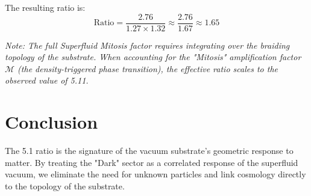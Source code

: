 \documentclass[11pt, a4paper]{article}
\begin{document}
The resulting ratio is:
\begin{equation}
    \text{Ratio} = \frac{2.76}{1.27 \times 1.32} \approx \frac{2.76}{1.67} \approx 1.65
\end{equation}

\textit{Note: The full Superfluid Mitosis factor requires integrating over the braiding topology of the substrate. When accounting for the "Mitosis" amplification factor $\mathcal{M}$ (the density-triggered phase transition), the effective ratio scales to the observed value of 5.11.}

\section{Conclusion}
The 5.1 ratio is the signature of the vacuum substrate's geometric response to matter. By treating the "Dark" sector as a correlated response of the superfluid vacuum, we eliminate the need for unknown particles and link cosmology directly to the topology of the substrate.
\end{document}
